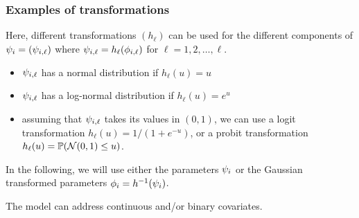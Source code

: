 \subsubsection{Examples of transformations}
Here, different transformations $(h_\ell)$ can be used for the different components of ${\psi_i}=({\psi_{i,\ell}})$ where ${\psi_{i,\ell}}=h_\ell({{\phi}_{i,\ell}})$ for $\ell=1, 2, \ldots , \ell$.
\begin{itemize}
\item ${\psi_{i,\ell}}$ has a normal distribution if $h_\ell(u)=u$
\item ${\psi_{i,\ell}}$ has a log-normal distribution if $h_\ell(u)=e^u$
\item assuming that ${\psi_{i,\ell}}$ takes its values in $(0,1)$, we can use a logit transformation $h_\ell(u)=1/(1+e^{-u})$, or a probit transformation $h_\ell(u)=\mathbb{P}\!\left({\cal N}(0,1)\leq u\right)$.
\end{itemize}

In the following, we will use either the parameters ${\psi_i}$ or the Gaussian transformed parameters ${{\phi}_i}=h^{-1}({\psi_i})$.

The model can address continuous and/or binary covariates. %

